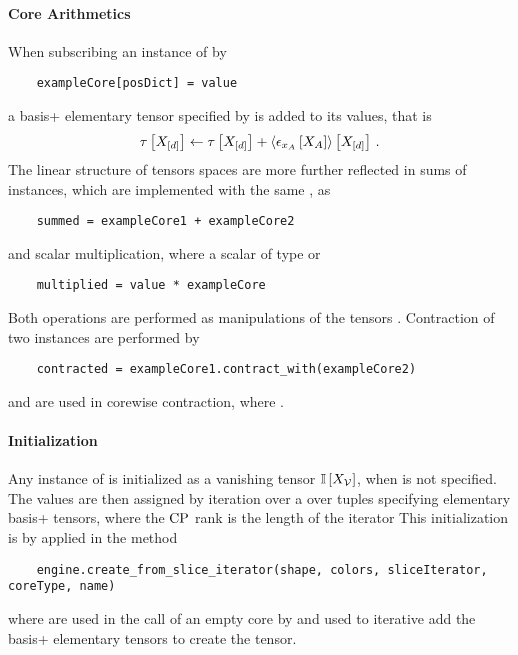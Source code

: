 \paragraph{Core Arithmetics}
When subscribing an instance  of  by
\begin{lstlisting}
	exampleCore[posDict] = value
\end{lstlisting}
a basis+ elementary tensor specified by  is added to its values, that is
\begin{align*}
    \tau\left[X_{[d]}\right] \leftarrow \tau\left[X_{[d]}\right] + \left\langle \epsilon_{x_{A}}\left[X_{A}\right]\right\rangle \left[ X_{[d]} \right] \, .
\end{align*}
The linear structure of tensors spaces are more further reflected in sums of  instances, which are implemented with the same , as
\begin{lstlisting}
	summed = exampleCore1 + exampleCore2
\end{lstlisting}
and scalar multiplication, where a scalar  of type  or 
\begin{lstlisting}
	multiplied = value * exampleCore
\end{lstlisting}
Both operations are performed as manipulations of the tensors .
Contraction of two  instances are performed by
\begin{lstlisting}
	contracted = exampleCore1.contract_with(exampleCore2)
\end{lstlisting}
and are used in corewise contraction, where .

\paragraph{Initialization}
Any instance of  is initialized as a vanishing tensor $\mathbb{I}\left[X_{\mathcal{V}}\right]$, when  is not specified.
The values are then assigned by iteration over a  over  tuples specifying elementary basis+ tensors, where the $\mathrm{CP}$ rank is the length of the iterator
This initialization is by applied in the method
\begin{lstlisting}
	engine.create_from_slice_iterator(shape, colors, sliceIterator, coreType, name)
\end{lstlisting}
where  are used in the call of an empty core by  and  used to iterative add the basis+ elementary tensors to create the tensor.

